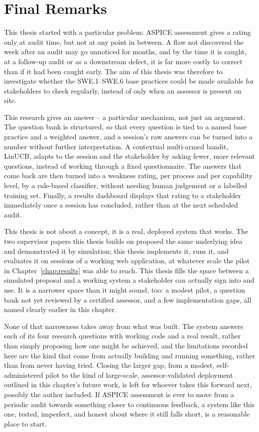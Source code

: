 \documentclass[a4paper, 12pt, oneside, openany, BCOR1cm,toc=chapterentrywithdots]{scrbook}
\begin{document}
\section{Final Remarks}

This thesis started with a particular problem: ASPICE assessment gives a rating only at audit
time, but not at any point in between. A flaw not discovered the week after an audit may go
unnoticed for months, and by the time it is caught, at a follow-up audit or as a downstream
defect, it is far more costly to correct than if it had been caught early. The aim of this
thesis was therefore to investigate whether the SWE.1--SWE.6 base practices could be made
available for stakeholders to check regularly, instead of only when an assessor is present on
site.

This research gives an answer -- a particular mechanism, not just an argument. The question bank
is structured, so that every question is tied to a named base practice and a weighted answer,
and a session's raw answers can be turned into a number without further interpretation. A
contextual multi-armed bandit, LinUCB, adapts to the session and the stakeholder by asking
fewer, more relevant questions, instead of working through a fixed questionnaire. The answers
that come back are then turned into a weakness rating, per process and per capability level, by
a rule-based classifier, without needing human judgement or a labelled training set. Finally, a
results dashboard displays that rating to a stakeholder immediately once a session has
concluded, rather than at the next scheduled audit.

This thesis is not about a concept, it is a real, deployed system that works. The two supervisor
papers this thesis builds on proposed the same underlying idea and demonstrated it by
simulation; this thesis implements it, runs it, and evaluates it on sessions of a working web
application, at whatever scale the pilot in Chapter~\ref{chap:results} was able to reach. This
thesis fills the space between a simulated proposal and a working system a stakeholder can
actually sign into and use. It is a narrower space than it might sound, too: a modest pilot, a
question bank not yet reviewed by a certified assessor, and a few implementation gaps, all named
clearly earlier in this chapter.

\newpage
None of that narrowness takes away from what was built. The system answers each of its four
research questions with working code and a real result, rather than simply proposing how one
might be achieved, and the limitations recorded here are the kind that come from actually
building and running something, rather than from never having tried. Closing the larger gap,
from a modest, self-administered pilot to the kind of large-scale, assessor-validated deployment
outlined in this chapter's future work, is left for whoever takes this forward next, possibly
the author included. If ASPICE assessment is ever to move from a periodic audit towards
something closer to continuous feedback, a system like this one, tested, imperfect, and honest
about where it still falls short, is a reasonable place to start.
\end{document}
